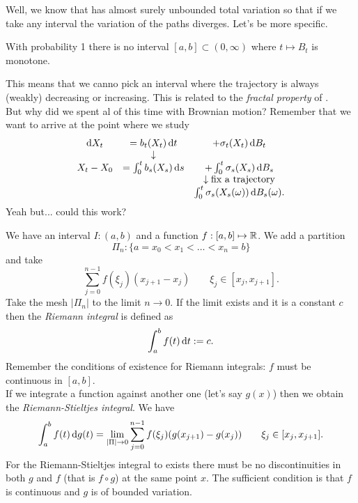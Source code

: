 \documentclass[crop=false, class=article]{standalone}
\begin{document}
Well, we know that  \brm{} has almost surely unbounded total variation so that if we take any interval the variation of the paths diverges. Let's be more specific.
\begin{proposition}
	With probability 1 there is no interval $[a,b]\subset(0,\infty)$ where $t\mapsto B_{t}$ is monotone.
\end{proposition}
This means that we canno pick an interval where the trajectory is always (weakly) decreasing or increasing. This is related to the \textit{fractal property} of \brm.\\
But why did we spent al of this time with Brownian motion? Remember that we want to arrive at the point where we study
\begin{equation*}
	\begin{array}{ccc}
		\mathop{}\!\mathrm{d} X_{t}&=b_{t}(X_{t})\mathop{}\!\mathrm{d} t&+\sigma_{t}(X_{t})\mathop{}\!\mathrm{d} B_{t}\\
		&\downarrow&\\
		X_{t}-X_{0}&=\int_{0}^{t}b_{s}(X_{s})\mathop{}\!\mathrm{d} s&+\int_{0}^{t}\sigma_{s}(X_{s})\mathop{}\!\mathrm{d} B_{s}\\
		&&\downarrow\text{fix a trajectory}\\
		&&\int_{0}^{t}\sigma_{s}(X_{s}(\omega))\mathop{}\!\mathrm{d} B_{s}(\omega).
	\end{array}
\end{equation*}
Yeah but... could this work?
\begin{revise}
	We have an interval $I:(a,b)$ and a function $f:[a,b]\mapsto\mathbb{R}$. We add a partition
	\begin{equation*}
		\Pi_{n}:\{a=x_{0}<x_{1}<\ldots<x_{n}=b\}
	\end{equation*}
	and take
	\begin{equation*}
		\sum_{j=0}^{n-1}f(\xi_j)(x_{j+1}-x_{j})\qquad\xi_{j}\in[x_{j},x_{j+1}].
	\end{equation*}
	Take the mesh $|\Pi_{n}|$ to the limit $n\to0$. If the limit exists and it is a constant $c$ then the \emph{Riemann integral} is defined as
	\begin{equation*}
		\int_{a}^{b}f(t)\mathop{}\!\mathrm{d} t:=c.
	\end{equation*}
	Remember the conditions of existence for Riemann integrals: $f$ must be continuous in $[a,b]$. \\
	If we integrate a function against another one (let's say $g(x)$) then we obtain the \emph{Riemann-Stieltjes integral}. We have
	\begin{equation*}
		\int_{a}^{b}f(t)\mathop{}\!\mathrm{d} g(t)=\lim_{|\Pi|\to 0}\sum_{j=0}^{n-1}f(\xi_j)(g(x_{j+1})-g(x_{j}))\qquad\xi_j\in[x_{j},x_{j+1}].
	\end{equation*}
	For the Riemann-Stieltjes integral to exists there must be no discontinuities in both $g$ and $f$ (that is $f\circ g$) at the same point $x$. The sufficient condition is that $f$ is continuous and $g$ is of bounded variation.
\end{revise}
\end{document}
